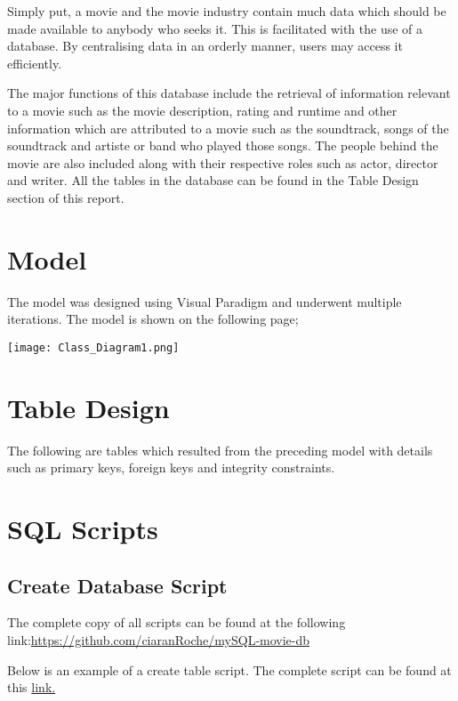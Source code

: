 \documentclass[12pt]{article}
\begin{document}
Simply put, a movie and the movie industry contain much data which should be made available to anybody who seeks it. This is facilitated with the use of a database. By centralising data in an orderly manner, users may access it efficiently.

The major functions of this database include the retrieval of information relevant to a movie such as the movie description, rating and runtime and other information which are attributed to a movie such as the soundtrack, songs of the soundtrack and artiste or band who played those songs. The people behind the movie are also included along with their respective roles such as actor, director and writer. All the tables in the database can be found in the Table Design section of this report. 

\newpage
\section{Model}
The model was designed using Visual Paradigm and underwent multiple iterations. The model is shown on the following page;
\begin{sidewaysfigure}
    \centering
    \texttt{[image: Class\_Diagram1.png]}
\end{sidewaysfigure}

\newpage
\section{Table Design}
The following are tables which resulted from the preceding model with details such as primary keys, foreign keys and integrity constraints.


\section{SQL Scripts}
\subsection{Create Database Script}

The complete copy of all scripts can be found at the following link:\newline \href{https://github.com/ciaranRoche/mySQL-movie-db}{https://github.com/ciaranRoche/mySQL-movie-db} \newline

Below is an example of a create table script. The complete script can be found at this \href{https://github.com/ciaranRoche/mySQL-movie-db/blob/master/database-createtable-script.sql}{link.}
\end{document}
